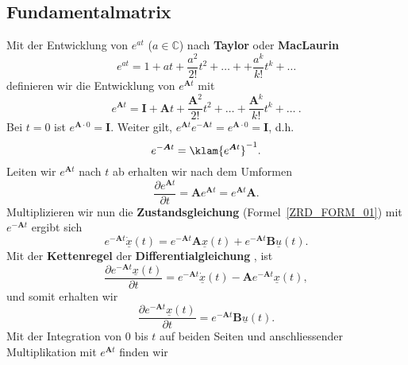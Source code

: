 \subsection{Fundamentalmatrix}
Mit der Entwicklung von $e^{at}$ ($a\in\mathbb{C}$) nach {\bf Taylor} oder {\bf MacLaurin} \cite{BRO:SEM:91} 
\begin{equation*}
e^{at}=1+at+\frac{a^2}{2!}t^2+\ldots ++\frac{a^k}{k!}t^k+\ldots
\end{equation*}
definieren wir die Entwicklung von $e^{\boldsymbol{A}t}$ mit \cite{HSU:95, UNB:89}
\begin{equation}
e^{\boldsymbol{A}t}=\boldsymbol{I}+\boldsymbol{A}t+\frac{\boldsymbol{A}^2}{2!}t^2+\ldots +\frac{\boldsymbol{A}^k}{k!}t^k+\ldots~.
\end{equation}
Bei $t=0$ ist $e^{\boldsymbol{A}\cdot 0}=\boldsymbol{I}$. Weiter gilt, $e^{\boldsymbol{A}t}e^{-\boldsymbol{A}t}=e^{\boldsymbol{A}\cdot 0}=\boldsymbol{I}$, d.h. \cite{HSU:95}
\begin{equation*}
e^{-\boldsymbol{A}t}=\klam{e^{\boldsymbol{A}t}}^{-1}.
\end{equation*}
Leiten wir $e^{\boldsymbol{A}t}$ nach $t$ ab erhalten wir nach dem Umformen \cite{UNB:89}
\begin{equation*}
\frac{\partial e^{\boldsymbol{A}t}}{\partial t}=\boldsymbol{A}e^{\boldsymbol{A}t}=e^{\boldsymbol{A}t}\boldsymbol{A}.
\end{equation*}
Multiplizieren wir nun die {\bf Zustandsgleichung} (Formel~\ref{ZRD_FORM_01}) mit $e^{-\boldsymbol{A}t}$ ergibt sich
\begin{equation*}
e^{-\boldsymbol{A}t}\dot{\underline{x}}(t) = e^{-\boldsymbol{A}t}\boldsymbol{A} \underline{x}(t) + e^{-\boldsymbol{A}t}\boldsymbol{B} \underline{u}(t).
\end{equation*}
Mit der {\bf Kettenregel} der {\bf Differentialgleichung} \cite{BRO:SEM:91}, ist
\begin{equation*}
\frac{\partial e^{-\boldsymbol{A}t}\underline{x}(t)}{\partial t}= e^{-\boldsymbol{A}t}\dot{\underline{x}}(t)-\boldsymbol{A}e^{-\boldsymbol{A}t}\underline{x}(t),
\end{equation*}
und somit erhalten wir
\begin{equation*}
\frac{\partial e^{-\boldsymbol{A}t}\underline{x}(t)}{\partial t}=e^{-\boldsymbol{A}t}\boldsymbol{B}\underline{u}(t).
\end{equation*}
Mit der Integration von 0 bis $t$ auf beiden Seiten und anschliessender Multiplikation mit  $e^{\boldsymbol{A}t}$ finden wir \cite{DIS:STU:WIL:90}\\~\\
